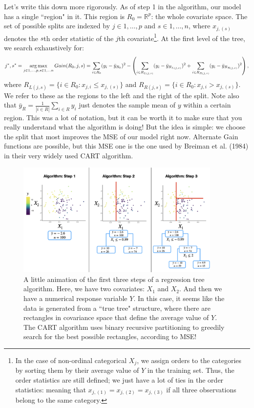 Let's write this down more rigorously. As of step 1 in the algorithm, our model has a single ``region" in it. This region is $R_0 = \mathbb{R}^p$: the whole covariate space. The set of possible splits are indexed by $j \in 1,\ldots,p$ and $s \in 1,\ldots, n$, where $x_{j,(s)}$ denotes the $s$th order statistic of the $j$th covariate\footnote{In the case of non-ordinal categorical $X_j$, we assign orders to the categories by sorting them by their average value of $Y$ in the training set. Thus, the order statistics are still defined; we just have a lot of ties in the order statistics: meaning that $x_{j,(1)}=x_{j,(2)}=x_{j,(3)}$ if all three observations belong to the same category.}. At the first level of the tree, we search exhaustively for:
\begin{equation}
\label{eq_SPLIT}
j^*, s^* = \mathop{\mathrm{arg\,max}}_{j \in 1,\ldots,p, s \in 1,\ldots n} Gain(R_0, j,s) = \sum_{i \in R_0} (y_i - \bar{y}_{R_0})^2 - \left( \sum_{i \in R_{L(j,s)}} (y_i - \bar{y}_{R_{L(j,s)}})^2  + \sum_{i \in R_{R(j,s)}} (y_i - \bar{y}_{R_{R(j,s)}})^2 \right),
\end{equation}
where $R_{L(j,s)} = \{ i \in R_0 : x_{j,i} \leq x_{j,(s)}\}$ and $R_{R(j,s)} = \{ i \in R_0 : x_{j,i} > x_{j,(s)}\}$. We refer to these as the regions to the left and the right of the split. Note also that $\bar{y}_R = \frac{1}{|i \in R|} \sum_{i \in R} y_i$ just denotes the sample mean of $y$ within a certain region. This was a lot of notation, but it can be worth it to make sure that you really understand what the algorithm is doing! But the idea is simple: we choose the split that most improves the MSE of our model right now. Alternate Gain functions are possible, but this MSE one is the one used by Breiman et al. (1984) in their very widely used CART algorithm. 

\begin{figure}[h]
\includegraphics[width=0.9\textwidth]{442_lecs/CART_figure/CART_figure.001.png}
\caption{A little animation of the first three steps of a regression tree algorithm. Here, we have two covariates: $X_1$ and $X_2$. And then we have a numerical response variable $Y$. In this case, it seems like the data is generated from a ``true tree" structure, where there are rectangles in covariance space that define the average value of $Y$. The CART algorithm uses binary recursive partitioning to greedily search for the best possible rectangles, according to MSE!}	
\label{fig_cart}
\end{figure}

